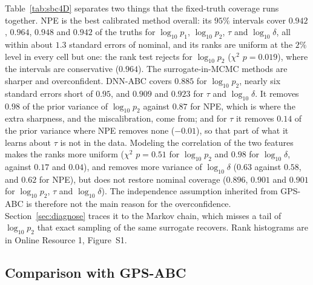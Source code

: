 \documentclass[sn-basic,iicol,pdflatex]{sn-jnl}
\begin{document}
Table~\ref{tab:sbc4D} separates two things that the fixed-truth coverage runs together. NPE is the best calibrated method overall: its $95\%$ intervals cover $0.942$, $0.964$, $0.948$ and $0.942$ of the truths for
$\log_{10}p_1$, $\log_{10}p_2$, $\tau$ and $\log_{10}\delta$, all within about $1.3$ standard errors of nominal, and
its ranks are uniform at the $2\%$ level in every cell but one: the rank test rejects for $\log_{10}p_2$ ($\chi^2$ $p=0.019$), where the intervals are conservative ($0.964$). The surrogate-in-MCMC methods are sharper and
overconfident. DNN-ABC covers $0.885$ for $\log_{10}p_2$, nearly six standard errors short of $0.95$, and $0.909$ and
$0.923$ for $\tau$ and $\log_{10}\delta$. It removes $0.98$ of the prior variance of $\log_{10}p_2$ against $0.87$ for NPE, which is where
the extra sharpness, and the miscalibration, come from; and for $\tau$ it removes $0.14$ of the prior variance where NPE removes
none ($-0.01$), so that part of what it learns about $\tau$ is not in the data. Modeling the correlation of the two features
makes the ranks more uniform ($\chi^2$ $p=0.51$ for $\log_{10}p_2$ and $0.98$ for $\log_{10}\delta$, against $0.17$ and $0.04$),
and removes more variance of $\log_{10}\delta$ ($0.63$ against $0.58$, and $0.62$ for NPE), but does not restore nominal
coverage ($0.896$, $0.901$ and $0.901$ for $\log_{10}p_2$, $\tau$ and $\log_{10}\delta$). The independence assumption inherited from GPS-ABC is therefore not the main
reason for the overconfidence. Section~\ref{sec:diagnose} traces it to the Markov chain, which misses a tail of $\log_{10}p_2$ that exact sampling of the same surrogate recovers.
Rank histograms are in Online Resource 1, Figure~S1.


\subsection{Comparison with GPS-ABC}
\label{sec:gps}
\end{document}
